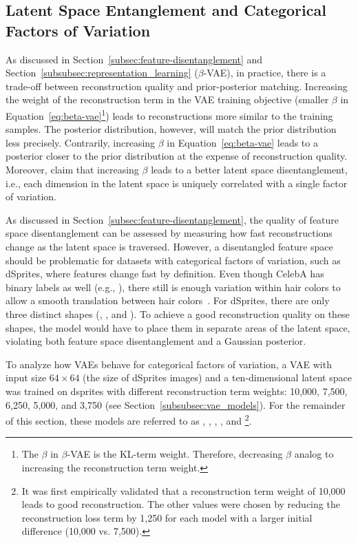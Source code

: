 \subsection{Latent Space Entanglement and Categorical Factors of Variation}\label{subsec:latent-space-entanglement-and-categorical-factors-of-variation}

As discussed in Section~\ref{subsec:feature-disentanglement} and Section~\ref{subsubsec:representation_learning} ($\beta$-\ac{VAE}), in practice, there is a trade-off between reconstruction quality and prior-posterior matching.
Increasing the weight of the reconstruction term in the \ac{VAE} training objective (smaller $\beta$ in Equation~\ref{eq:beta-vae}\footnote{The $\beta$ in $\beta$-\ac{VAE} is the \ac{KL}-term weight. Therefore, decreasing $\beta$ analog to increasing the reconstruction term weight.}) leads to reconstructions more similar to the training samples.
The posterior distribution, however, will match the prior distribution less precisely.
Contrarily, increasing $\beta$ in Equation~\ref{eq:beta-vae} leads to a posterior closer to the prior distribution at the expense of reconstruction quality.
Moreover, \citet{higgins2017beta} claim that increasing $\beta$ leads to a better latent space disentanglement, i.e., each dimension in the latent space is uniquely correlated with a single factor of variation.

As discussed in Section~\ref{subsec:feature-disentanglement}, the quality of feature space disentanglement can be assessed by measuring how fast reconstructions change as the latent space is traversed.
However, a disentangled feature space should be problematic for datasets with categorical factors of variation, such as dSprites, where features change fast by definition.
Even though CelebA has binary labels as well (e.g., ), there still is enough variation within hair colors to allow a smooth translation between hair colors~\citep{higgins2017beta}.
For dSprites, there are only three distinct shapes (, , and ).
To achieve a good reconstruction quality on these shapes, the model would have to place them in separate areas of the latent space, violating both feature space disentanglement and a Gaussian posterior.

To analyze how \acp{VAE} behave for categorical factors of variation, a \ac{VAE} with input size $64\times 64$ (the size of dSprites images) and a ten-dimensional latent space was trained on dsprites with different reconstruction term weights: 10,000, 7,500, 6,250, 5,000, and 3,750 (see Section~\ref{subsubsec:vae_models}).
For the remainder of this section, these models are referred to as , , , , and \footnote{It was first empirically validated that a reconstruction term weight of 10,000 leads to good reconstruction. The other values were chosen by reducing the reconstruction loss term by 1,250 for each model with a larger initial difference (10,000 vs. 7,500).}.

